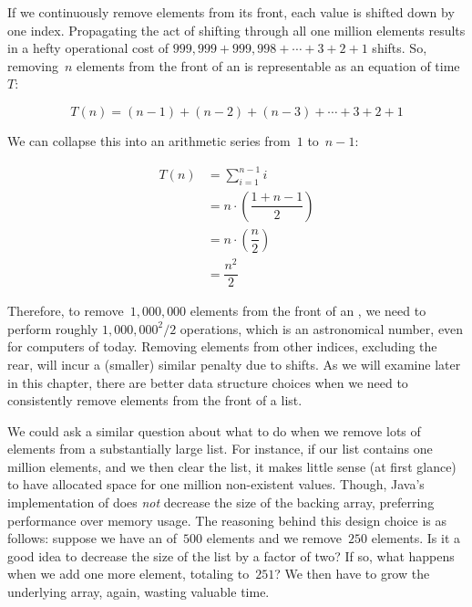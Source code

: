 If we continuously remove elements from its front, each value is shifted down by one index. 
Propagating the act of shifting through all one million elements results in a hefty operational cost of $999,999 + 999,998 + \cdots + 3 + 2 + 1$ shifts. 
So, removing~$n$ elements from the front of an  is representable as an equation of time~$T$:

\[
T(n) = (n - 1) + (n - 2) + (n - 3) + \cdots + 3 + 2 + 1
\]

We can collapse this into an arithmetic series from~$1$ to~$n-1$:

\begin{align*}
T(n) &= \sum_{i=1}^{n-1}{i}\\
     &= n\cdot \left(\dfrac{1 + n - 1}{2}\right)\\
     &= n\cdot \left(\dfrac{n}{2}\right)\\
     &= \dfrac{n^2}{2}
\end{align*}

Therefore, to remove~$1,000,000$ elements from the front of an , we need to perform roughly $1,000,000^2/{2}$ operations, which is an astronomical number, even for computers of today.
Removing elements from other indices, excluding the rear, will incur a (smaller) similar penalty due to shifts. 
As we will examine later in this chapter, there are better data structure choices when we need to consistently remove elements from the front of a list.

We could ask a similar question about what to do when we remove lots of elements from a substantially large list. 
For instance, if our list contains one million elements, and we then clear the list, it makes little sense (at first glance) to have allocated space for one million non-existent values.
Though, Java's implementation of  does \emph{not} decrease the size of the backing array, preferring performance over memory usage. 
The reasoning behind this design choice is as follows: suppose we have an  of~$500$ elements and we remove~$250$ elements. 
Is it a good idea to decrease the size of the list by a factor of two? 
If so, what happens when we add one more element, totaling to~$251$? 
We then have to grow the underlying array, again, wasting valuable time.

